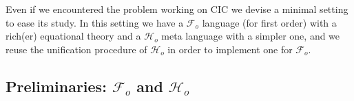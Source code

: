 \documentclass[sigconf,natbib=false,review]{acmart}
\newcommand{\llambda}{\ensuremath{\mathcal{L}_\lambda}\xspace}
\newcommand{\Fo}{\ensuremath{\mathcal{F}_{\!o}\xspace}} %
\newcommand{\Ho}{\ensuremath{\mathcal{H}_o}\xspace}
\begin{document}
\newcommand{\specunif}[3]{
  \{#3_1, #3_2\} \subseteq \llambda \Rightarrow %
    \exists \rho, %
      \rho #3_1 #1 \rho #3_2  %
        \Leftrightarrow #3_1 #2 #3_2 \mapsto \rho' \subseteq \rho
}


\newcommand{\unifcorrect}[3]{
    \{#3_1, #3_2\} \subseteq \llambda \Rightarrow
      #3_1 #2 #3_2 \mapsto \rho
        \Rightarrow
          \rho #3_1 #1 \rho #3_2  %
}

\newcommand{\unifcomplete}[3]{
    \{#3_1, #3_2\} \subseteq \llambda \Rightarrow
        \rho #3_1 #1 \rho #3_2  %
          \Rightarrow \exists \rho', #3_1 #2 #3_2 \mapsto \rho' \land \rho' \subseteq \rho
}
\newcommand{\maybeeta}{\ensuremath{\Diamond\eta}\xspace}
\newcommand{\maybebeta}{\ensuremath{\Diamond\beta_0}\xspace}
\newcommand{\notllambda}{\ensuremath{\Diamond\llambda}\xspace}

Even if we encountered the problem working on CIC we devise
a minimal setting to ease its study. In this setting we have
a \Fo{} language (for first order) with a rich(er) equational
theory and a \Ho{} meta language with a simpler one, and we reuse
the unification procedure of \Ho{} in order to implement one for \Fo.


\subsection{Preliminaries: \Fo{} and \Ho{}}
\end{document}
